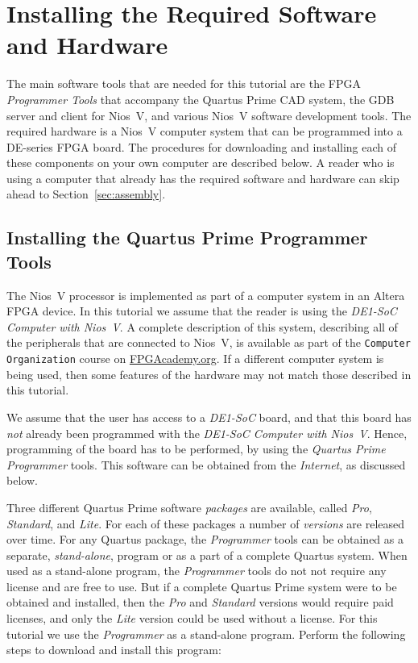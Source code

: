\documentclass[11pt, twoside, pdftex]{article}
\begin{document}
\section{Installing the Required Software and Hardware}
\label{sec:getthem}

The main software tools that are needed for this tutorial are the FPGA {\it Programmer
Tools} that accompany the Quartus Prime CAD system, the GDB server and client for Nios~V, and 
various Nios~V software development tools. The required hardware is a Nios~V computer
system that can be programmed into a DE-series FPGA board. The procedures for downloading and 
installing each of these components on your own computer are described below. A reader who 
is using a computer that already has the required software and hardware can skip ahead to 
Section~\ref{sec:assembly}. 

\subsection{Installing the Quartus Prime Programmer Tools}
\label{sec:programmer}

The Nios~V processor is implemented as part of a computer system in an Altera FPGA device. 
In this tutorial we assume that the reader is using the {\it DE1-SoC Computer with Nios~V}.
A complete description of this system, describing all of the peripherals that are
connected to Nios~V, is available as part of the \texttt{Computer Organization} course 
on {\small \href{https://www.fpgacademy.org/courses.html} {FPGAcademy.org}}. If a
different computer system is being used, then some features of the hardware may not match
those described in this tutorial.

We assume that the user has access to a {\it DE1-SoC} board, and that this board has {\it not} 
already been programmed with the {\it DE1-SoC Computer with Nios~V}. Hence, programming of 
the board has to be performed, by using the {\it Quartus Prime Programmer} tools. This 
software can be obtained from the {\it Internet}, as discussed below. 

Three different Quartus Prime software {\it packages} are available, called {\it Pro},
{\it Standard}, and {\it Lite}. For each of these packages a number of {\it versions} are
released over time.  For any Quartus package, the {\it Programmer} tools can be 
obtained as a separate, {\it stand-alone}, program or as a part of a complete 
Quartus system. When used as a stand-alone program, the {\it Programmer} tools do not 
not require any license and are free to use. But if a complete Quartus Prime system 
were to be obtained and installed, then the {\it Pro} and {\it Standard} versions would 
require paid licenses, and only the {\it Lite} version could be used without a license. For 
this tutorial we use the {\it Programmer} as a stand-alone program. Perform the following
steps to download and install this program:
\end{document}
